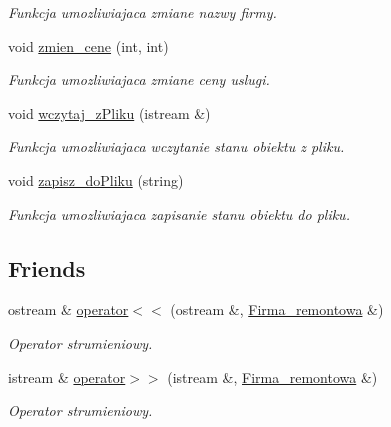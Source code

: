 \begin{DoxyCompactItemize}
\begin{DoxyCompactList}\small\item\em Funkcja umozliwiajaca zmiane nazwy firmy. \end{DoxyCompactList}\item 
void \hyperlink{class_firma__remontowa_a231e8446931c11fc608b5026204de56f}{zmien\+\_\+cene} (int, int)
\begin{DoxyCompactList}\small\item\em Funkcja umozliwiajaca zmiane ceny uslugi. \end{DoxyCompactList}\item 
\hypertarget{class_firma__remontowa_a0d15798ca03b0ebe81f333e25ee6c209}{}void \hyperlink{class_firma__remontowa_a0d15798ca03b0ebe81f333e25ee6c209}{wczytaj\+\_\+z\+Pliku} (istream \&)\label{class_firma__remontowa_a0d15798ca03b0ebe81f333e25ee6c209}

\begin{DoxyCompactList}\small\item\em Funkcja umozliwiajaca wczytanie stanu obiektu z pliku. \end{DoxyCompactList}\item 
\hypertarget{class_firma__remontowa_a982872b417e2d0dc7a44f95fcd05a3a5}{}void \hyperlink{class_firma__remontowa_a982872b417e2d0dc7a44f95fcd05a3a5}{zapisz\+\_\+do\+Pliku} (string)\label{class_firma__remontowa_a982872b417e2d0dc7a44f95fcd05a3a5}

\begin{DoxyCompactList}\small\item\em Funkcja umozliwiajaca zapisanie stanu obiektu do pliku. \end{DoxyCompactList}\end{DoxyCompactItemize}
\subsection*{Friends}
\begin{DoxyCompactItemize}
\item 
\hypertarget{class_firma__remontowa_ac3b1f713f74aaecd01167600c9166b25}{}ostream \& \hyperlink{class_firma__remontowa_ac3b1f713f74aaecd01167600c9166b25}{operator$<$$<$} (ostream \&, \hyperlink{class_firma__remontowa}{Firma\+\_\+remontowa} \&)\label{class_firma__remontowa_ac3b1f713f74aaecd01167600c9166b25}

\begin{DoxyCompactList}\small\item\em Operator strumieniowy. \end{DoxyCompactList}\item 
\hypertarget{class_firma__remontowa_a47a7efe31fd7ca3e995d2544635d252c}{}istream \& \hyperlink{class_firma__remontowa_a47a7efe31fd7ca3e995d2544635d252c}{operator$>$$>$} (istream \&, \hyperlink{class_firma__remontowa}{Firma\+\_\+remontowa} \&)\label{class_firma__remontowa_a47a7efe31fd7ca3e995d2544635d252c}

\begin{DoxyCompactList}\small\item\em Operator strumieniowy. \end{DoxyCompactList}\end{DoxyCompactItemize}


